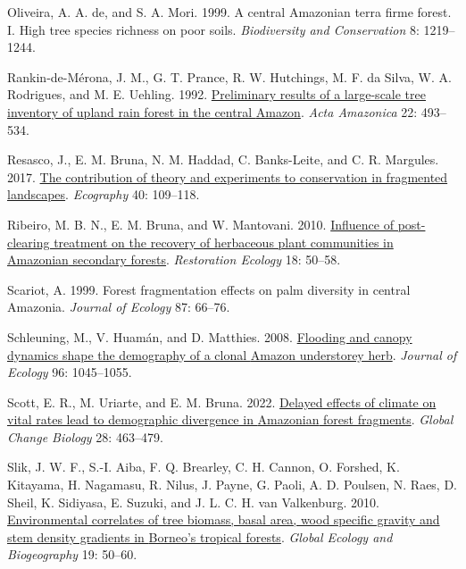 \documentclass[
  12pt,
  man, donotrepeattitle,floatsintext]{apa6}
\newlength{\cslhangindent}
\newlength{\cslentryspacingunit} %
\newenvironment{CSLReferences}[2] %
 {%
  \setlength{\parindent}{0pt}
  \ifodd #1
  \let\oldpar\par
  \def\par{\hangindent=\cslhangindent\oldpar}
  \fi
  \setlength{\parskip}{#2\cslentryspacingunit}
 }%
 {}
\begin{document}
\begin{CSLReferences}{1}{0}
\leavevmode{}%
Oliveira, A. A. de, and S. A. Mori. 1999. A central {Amazonian} terra firme forest. {I}. {High} tree species richness on poor soils. \emph{Biodiversity and Conservation} 8: 1219--1244.

\leavevmode{}%
Rankin-de-Mérona, J. M., G. T. Prance, R. W. Hutchings, M. F. da Silva, W. A. Rodrigues, and M. E. Uehling. 1992. \href{https://doi.org/10.1590/1809-43921992224534}{Preliminary results of a large-scale tree inventory of upland rain forest in the central {Amazon}}. \emph{Acta Amazonica} 22: 493--534.

\leavevmode{}%
Resasco, J., E. M. Bruna, N. M. Haddad, C. Banks-Leite, and C. R. Margules. 2017. \href{https://doi.org/10.1111/ecog.02546}{The contribution of theory and experiments to conservation in fragmented landscapes}. \emph{Ecography} 40: 109--118.

\leavevmode{}%
Ribeiro, M. B. N., E. M. Bruna, and W. Mantovani. 2010. \href{https://doi.org/10.1111/j.1526-100X.2010.00715.x}{Influence of post-clearing treatment on the recovery of herbaceous plant communities in {Amazonian} secondary forests}. \emph{Restoration Ecology} 18: 50--58.

\leavevmode{}%
Scariot, A. 1999. Forest fragmentation effects on palm diversity in central {Amazonia}. \emph{Journal of Ecology} 87: 66--76.

\leavevmode{}%
Schleuning, M., V. Huamán, and D. Matthies. 2008. \href{https://doi.org/10.1111/j.1365-2745.2008.01416.x}{Flooding and canopy dynamics shape the demography of a clonal {Amazon} understorey herb}. \emph{Journal of Ecology} 96: 1045--1055.

\leavevmode{}%
Scott, E. R., M. Uriarte, and E. M. Bruna. 2022. \href{https://doi.org/10.1111/gcb.15900}{Delayed effects of climate on vital rates lead to demographic divergence in {Amazonian} forest fragments}. \emph{Global Change Biology} 28: 463--479.

\leavevmode{}%
Slik, J. W. F., S.-I. Aiba, F. Q. Brearley, C. H. Cannon, O. Forshed, K. Kitayama, H. Nagamasu, R. Nilus, J. Payne, G. Paoli, A. D. Poulsen, N. Raes, D. Sheil, K. Sidiyasa, E. Suzuki, and J. L. C. H. van Valkenburg. 2010. \href{https://doi.org/10.1111/j.1466-8238.2009.00489.x}{Environmental correlates of tree biomass, basal area, wood specific gravity and stem density gradients in {Borneo}'s tropical forests}. \emph{Global Ecology and Biogeography} 19: 50--60.


\end{CSLReferences}
\end{document}
